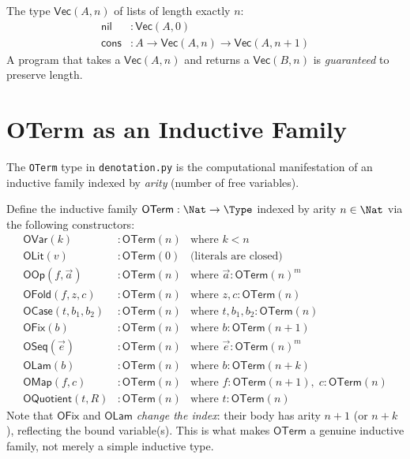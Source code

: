 \begin{example}
The type $\mathsf{Vec}(A, n)$ of lists of length exactly $n$:
\begin{align}
  \mathsf{nil} &: \mathsf{Vec}(A, 0) \\
  \mathsf{cons} &: A \to \mathsf{Vec}(A, n) \to \mathsf{Vec}(A, n+1)
\end{align}
A program that takes a $\mathsf{Vec}(A, n)$ and returns a
$\mathsf{Vec}(B, n)$ is \emph{guaranteed} to preserve length.
\end{example}

\section{OTerm as an Inductive Family}

The \texttt{OTerm} type in \texttt{denotation.py} is the
computational manifestation of an inductive family indexed by
\emph{arity} (number of free variables).

\begin{definition}
\label{def:oterm-family}
Define the inductive family $\mathsf{OTerm} : \Nat \to \Type$
indexed by arity $n \in \Nat$ via the following constructors:
\begin{align}
  \mathsf{OVar}(k)       &: \mathsf{OTerm}(n)
    & \text{where } k < n \\
  \mathsf{OLit}(v)       &: \mathsf{OTerm}(0)
    & \text{(literals are closed)} \\
  \mathsf{OOp}(f, \vec{a}) &: \mathsf{OTerm}(n)
    & \text{where } \vec{a} : \mathsf{OTerm}(n)^m \\
  \mathsf{OFold}(f, z, c) &: \mathsf{OTerm}(n)
    & \text{where } z, c : \mathsf{OTerm}(n) \\
  \mathsf{OCase}(t, b_1, b_2) &: \mathsf{OTerm}(n)
    & \text{where } t, b_1, b_2 : \mathsf{OTerm}(n) \\
  \mathsf{OFix}(b)       &: \mathsf{OTerm}(n)
    & \text{where } b : \mathsf{OTerm}(n{+}1) \\
  \mathsf{OSeq}(\vec{e}) &: \mathsf{OTerm}(n)
    & \text{where } \vec{e} : \mathsf{OTerm}(n)^m \\
  \mathsf{OLam}(b)       &: \mathsf{OTerm}(n)
    & \text{where } b : \mathsf{OTerm}(n{+}k) \\
  \mathsf{OMap}(f, c)    &: \mathsf{OTerm}(n)
    & \text{where } f : \mathsf{OTerm}(n{+}1),\; c : \mathsf{OTerm}(n) \\
  \mathsf{OQuotient}(t, R)  &: \mathsf{OTerm}(n)
    & \text{where } t : \mathsf{OTerm}(n)
\end{align}
Note that $\mathsf{OFix}$ and $\mathsf{OLam}$ \emph{change the index}:
their body has arity $n{+}1$ (or $n{+}k$), reflecting the bound
variable(s).  This is what makes $\mathsf{OTerm}$ a genuine inductive
family, not merely a simple inductive type.
\end{definition}


